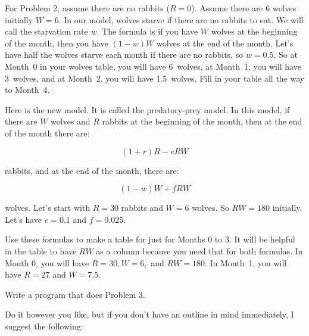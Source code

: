 \bigskip

\nobreak\bigskip

\noindent For Problem 2, assume there are no rabbits ($R=0$). Assume there are 6 wolves initially $W=6$. In our model, wolves starve if there are no rabbits to eat. We will call the starvation rate $w$. The formula is if you have $W$ wolves at the beginning of the month, then you have $(1-w)W$ wolves at the end of the month. Let's have half the wolves starve each month if there are no rabbits, so $w=0.5$. So at Month~0 in your wolves table, you will have 6~wolves, at Month~1, you will have 3~wolves, and at Month~2, you will have 1.5~wolves. Fill in your table all the way to Month~4.

\bigskip


\bigskip


\bigskip

\noindent Here is the new model. It is called the predatory-prey model. In this model, if there are $W$ wolves and $R$ rabbits at the beginning of the month, then at the end of the month there are:

$$(1 + r)R - e R W$$

\noindent rabbits, and at the end of the month, there are:

$$(1 - w)W + f R W$$

\noindent wolves. Let's start with $R=30$ rabbits and $W=6$ wolves. So $R W = 180$ initially. Let's have $e = 0.1$ and $f = 0.025$.

Use these formulas to make a table for just for Months 0 to 3. It will be helpful in the table to have $R W$ as a column because you need that for both formulas.  In Month 0, you will have $R=30, W=6,$ and $R W=180$. In Month~1, you will have $R=27$ and $W=7.5$.

\vfil\break

\bigskip\nobreak
\noindent Write a program that does Problem 3.

\bigskip

\noindent Do it however you like, but if you don't have an outline in mind immediately, I suggest the following:

\bigskip

